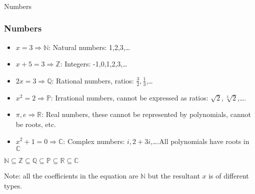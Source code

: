 \begin{frame}[fragile]\frametitle{}
\begin{center}
{\Large Numbers}
\end{center}
\end{frame}

 \begin{frame}[fragile]\frametitle{Numbers}
\begin{itemize}
\item $ x = 3 \Rightarrow \mathbb{N}$: Natural numbers: 1,2,3,\ldots
\item $ x + 5 = 3 \Rightarrow \mathbb{Z}$: Integers: -1,0,1,2,3,\ldots
\item $ 2x = 3 \Rightarrow \mathbb{Q}$: Rational numbers, ratios: $\frac{3}{2},\frac{1}{3}$,\ldots
\item $ x^2 = 2 \Rightarrow \mathbb{P}$: Irrational numbers, cannot be expressed as ratios: $\sqrt{2},\sqrt[3]{2}$,\ldots.
\item $\pi, e \Rightarrow \mathbb{R}$: Real numbers, these cannot be represented by polynomials, cannot be roots, etc.
\item $ x^2 +1 = 0 \Rightarrow \mathbb{C}$: Complex numbers: $i,2+3i$,\ldots.All polynomials have roots in $\mathbb{C}$
\end{itemize}

$\mathbb{N} \subseteq \mathbb{Z} \subseteq \mathbb{Q} \subseteq \mathbb{P} \subseteq \mathbb{R} \subseteq \mathbb{C} $

Note: all the coefficients in the equation are $\mathbb{N}$ but the resultant $x$ is of different types.
\end{frame}